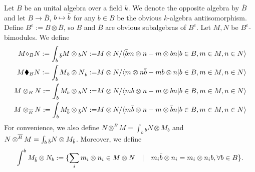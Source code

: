 \documentclass[a4paper,reqno]{amsart}
\numberwithin{equation}{section}
\theoremstyle{plain}
\theoremstyle{remark}
\numberwithin{equation}{section}
\newcommand{\ot}{\otimes}
\newcommand{\BB}{\overline{B}}
\newcommand{\di}{{\diamond_{B}}}
\begin{document}
Let $B$ be an unital algebra over a field $k$. We denote the opposite algebra by $\BB$ and let $B\to \BB$, $b\mapsto\Bar{b}$ for any $b\in B$ be the obvious $k$-algebra antiisomorphism. Define $B^{e}:=B\ot \BB$, so $B$ and $\BB$ are obvious subalgebras of $B^{e}$. Let $M, N$ be $B^{e}$-bimodules. We define
\begin{align*}
    M\di N:=\int_{b} {}_{\Bar{b}}M\ot {}_{b}N:=&M\ot N/\langle \Bar{b}m\ot n-m\ot bn|b\in B, m\in M, n\in N\rangle\\
    M\blacklozenge_{B} N:=\int_{b} M{}_{b}\ot N{}_{\Bar{b}}:=&M\ot N/\langle m\ot n\Bar{b}-mb\ot n|b\in B, m\in M, n\in N\rangle\\
    M\ot_{B} N:=\int_{b} M_{b}\ot {}_{b}N:=&M\ot N/\langle mb\ot n-m\ot bn|b\in B, m\in M, n\in N\rangle\\
    M\ot_{\BB} N:=\int_{b} M_{\Bar{b}}\ot {}_{\Bar{b}}N:=&M\ot N/\langle m\Bar{b}\ot n-m\ot \Bar{b}n|b\in B, m\in M, n\in N\rangle\\
\end{align*}
For convenience, we also define $N\ot^{B}M=\int_{b} {}_{b}N\ot M_{b}$ and  $N\ot^{\BB}M=\int_{b} {}_{\Bar{b}}N\ot M_{\Bar{b}}$. Moreover, we define
\begin{align*}
    \int^{b}M_{\Bar{b}}\ot N_{b}:=\{\sum_{i}m_{i}\ot n_{i}\in M\ot N\quad |\quad m_{i}\Bar{b}\ot n_{i}=m_{i}\ot n_{i}b, \forall b\in B\}.
\end{align*}
\end{document}

